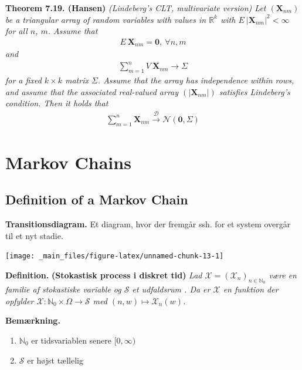\documentclass[
]{book}
\providecommand{\tightlist}{%
  \setlength{\itemsep}{0pt}\setlength{\parskip}{0pt}}
\begin{document}
\textbf{Theorem 7.19. (Hansen)} \emph{(Lindeberg's CLT, multivariate version) Let \((\mathbf{X}_{nm})\) be a triangular array of random variables with values in \(\mathbb{R}^k\) with \(E\ \vert \mathbf{X}_{nm}\vert^2<\infty\) for all \(n\), \(m\). Assume that}
\begin{align*}
    E\ \mathbf{X}_{nm}=\mathbf{0},\ \forall n,m
\end{align*}
\emph{and}
\begin{align*}
    \sum_{m=1}^n V\ \mathbf{X}_{nm}\to \Sigma
\end{align*}
\emph{for a fixed \(k\times k\) matrix \(\Sigma\). Assume that the array has independence within rows, and assume that the associated real-valued array \((\vert\mathbf{X}_{nm}\vert )\) satisfies Lindeberg's condition. Then it holds that}
\begin{align*}
    \sum_{m=1}^n\mathbf{X}_{nm}\stackrel{\mathcal{D}}{\to} \mathcal{N}(\mathbf{0},\Sigma)
\end{align*}

\hypertarget{markov-chains}{%
\chapter{Markov Chains}\label{markov-chains}}

\hypertarget{definition-of-a-markov-chain}{%
\section{Definition of a Markov Chain}\label{definition-of-a-markov-chain}}

\textbf{Transitionsdiagram.} Et diagram, hvor der fremgår ssh. for et system overgår til et nyt stadie.

\begin{center}\texttt{[image: \_main\_files/figure-latex/unnamed-chunk-13-1]} \end{center}

\textbf{Definition.} \textbf{(Stokastisk process i diskret tid)} \emph{Lad \(\mathcal{X}=(\mathcal{X}_n)_{n\in\mathbb{N}_0}\) være en familie af stokastiske variable og \(\mathcal{S}\) et udfaldsrum . Da er \(\mathcal{X}\) en funktion der opfylder \(\mathcal{X} : \mathbb{N}_0\times \Omega \to \mathcal{S}\) med \((n,w) \mapsto \mathcal{X}_n(w)\).}

\textbf{Bemærkning.}

\begin{enumerate}
\def\labelenumi{\roman{enumi}.}
\tightlist
\item
  \(\mathbb{N}_0\) er tidsvariablen senere \([0,\infty)\)
\item
  \(\mathcal{S}\) er højst tællelig
\end{enumerate}
\end{document}
